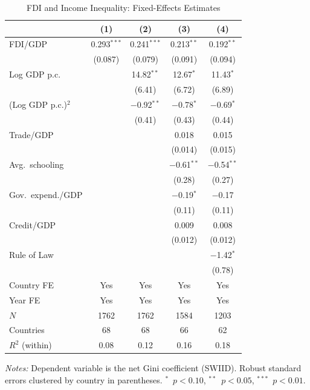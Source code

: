 \documentclass[12pt,a4paper]{article}
\begin{document}
\begin{table}[H]
\centering
\caption{FDI and Income Inequality: Fixed-Effects Estimates}
\label{tab:baseline}
\begin{threeparttable}
\begin{tabular}{@{} l cccc @{}}
\toprule
 & (1) & (2) & (3) & (4) \\
\midrule
FDI/GDP        & 0.293$^{***}$ & 0.241$^{***}$ & 0.213$^{**}$  & 0.192$^{**}$ \\
               & (0.087)       & (0.079)       & (0.091)       & (0.094)      \\[4pt]
Log GDP p.c.   &               & 14.82$^{**}$  & 12.67$^{*}$   & 11.43$^{*}$  \\
               &               & (6.41)        & (6.72)        & (6.89)       \\[4pt]
(Log GDP p.c.)$^{2}$ &         & $-$0.92$^{**}$ & $-$0.78$^{*}$ & $-$0.69$^{*}$ \\
               &               & (0.41)        & (0.43)        & (0.44)       \\[4pt]
Trade/GDP      &               &               & 0.018         & 0.015        \\
               &               &               & (0.014)       & (0.015)      \\[4pt]
Avg.\ schooling &              &               & $-$0.61$^{**}$ & $-$0.54$^{**}$ \\
               &               &               & (0.28)        & (0.27)       \\[4pt]
Gov.\ expend./GDP &            &               & $-$0.19$^{*}$ & $-$0.17      \\
               &               &               & (0.11)        & (0.11)       \\[4pt]
Credit/GDP     &               &               & 0.009         & 0.008        \\
               &               &               & (0.012)       & (0.012)      \\[4pt]
Rule of Law    &               &               &               & $-$1.42$^{*}$ \\
               &               &               &               & (0.78)       \\[4pt]
\midrule
Country FE     & Yes & Yes & Yes & Yes \\
Year FE        & Yes & Yes & Yes & Yes \\
$N$            & 1762 & 1762 & 1584 & 1203 \\
Countries      & 68   & 68   & 66   & 62   \\
$R^{2}$ (within) & 0.08 & 0.12 & 0.16 & 0.18 \\
\bottomrule
\end{tabular}
\begin{tablenotes}[flushleft]\footnotesize
\item \textit{Notes:} Dependent variable is the net Gini coefficient (SWIID).  Robust standard errors clustered by country in parentheses.  $^{*}$~$p<0.10$, $^{**}$~$p<0.05$, $^{***}$~$p<0.01$.
\end{tablenotes}
\end{threeparttable}
\end{table}
\end{document}
